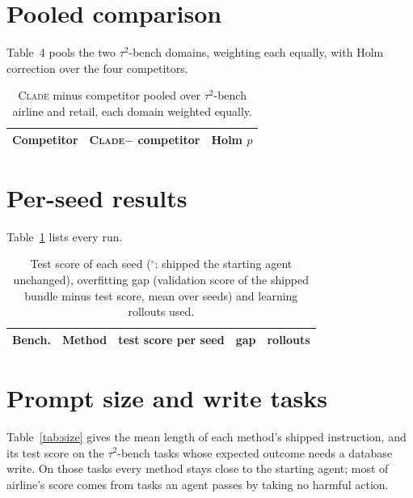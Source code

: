 \documentclass[11pt]{article}
\newcommand{\clade}{\textsc{Clade}\xspace}
\newcommand{\taub}{$\tau^2$-bench\xspace}
\begin{document}
\section{Pooled comparison}
\label{app:pooled}

Table~4 pools the two \taub domains, weighting each equally, with Holm correction over the four competitors.

\begin{table}[H]
\centering
\small
\setlength{\tabcolsep}{3pt}
\begin{tabular}{lcc}
\toprule
Competitor & \clade $-$ competitor & Holm $p$ \\
\midrule

\end{tabular}
\caption{\clade minus competitor pooled over \taub airline and retail, each domain weighted equally.}
\end{table}

\section{Per-seed results}
\label{app:seeds}

Table~\ref{tab:seeds} lists every run.

\begin{table}[H]
\centering
\scriptsize
\setlength{\tabcolsep}{2pt}
\begin{tabular}{llccc}
\toprule
Bench. & Method & test score per seed & gap & rollouts \\
\midrule

\end{tabular}
\caption{Test score of each seed ($^\circ$: shipped the starting agent unchanged), overfitting gap (validation score
of the shipped bundle minus test score, mean over seeds) and learning rollouts used.}
\label{tab:seeds}
\end{table}

\section{Prompt size and write tasks}
\label{app:size}

Table~\ref{tab:size} gives the mean length of each method's shipped instruction, and its test score on the \taub tasks
whose expected outcome needs a database write. On those tasks every method stays close to the starting agent; most
of airline's score comes from tasks an agent passes by taking no harmful action.
\end{document}
